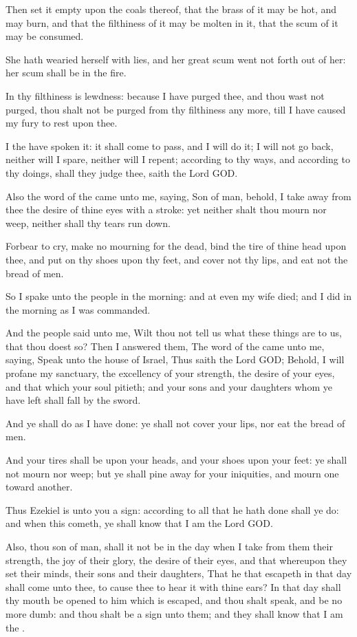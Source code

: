 \Verse Then set it empty upon the coals thereof, that the brass of it may be hot, and may burn, and that the filthiness of it may be molten in it, that the scum of it may be consumed.

\Verse She hath wearied herself with lies, and her great scum went not forth out of her: her scum shall be in the fire.

\Verse In thy filthiness is lewdness: because I have purged thee, and thou wast not purged, thou shalt not be purged from thy filthiness any more, till I have caused my fury to rest upon thee.

\Verse I the \LORD have spoken it: it shall come to pass, and I will do it; I will not go back, neither will I spare, neither will I repent; according to thy ways, and according to thy doings, shall they judge thee, saith the Lord GOD.

\Verse Also the word of the \LORD came unto me, saying, \Verse Son of man, behold, I take away from thee the desire of thine eyes with a stroke: yet neither shalt thou mourn nor weep, neither shall thy tears run down.

\Verse Forbear to cry, make no mourning for the dead, bind the tire of thine head upon thee, and put on thy shoes upon thy feet, and cover not thy lips, and eat not the bread of men.

\Verse So I spake unto the people in the morning: and at even my wife died; and I did in the morning as I was commanded.

\Verse And the people said unto me, Wilt thou not tell us what these things are to us, that thou doest so?  \Verse Then I answered them, The word of the \LORD came unto me, saying, \Verse Speak unto the house of Israel, Thus saith the Lord GOD; Behold, I will profane my sanctuary, the excellency of your strength, the desire of your eyes, and that which your soul pitieth; and your sons and your daughters whom ye have left shall fall by the sword.

\Verse And ye shall do as I have done: ye shall not cover your lips, nor eat the bread of men.

\Verse And your tires shall be upon your heads, and your shoes upon your feet: ye shall not mourn nor weep; but ye shall pine away for your iniquities, and mourn one toward another.

\Verse Thus Ezekiel is unto you a sign: according to all that he hath done shall ye do: and when this cometh, ye shall know that I am the Lord GOD.

\Verse Also, thou son of man, shall it not be in the day when I take from them their strength, the joy of their glory, the desire of their eyes, and that whereupon they set their minds, their sons and their daughters, \Verse That he that escapeth in that day shall come unto thee, to cause thee to hear it with thine ears?  \Verse In that day shall thy mouth be opened to him which is escaped, and thou shalt speak, and be no more dumb: and thou shalt be a sign unto them; and they shall know that I am the \LORD.


